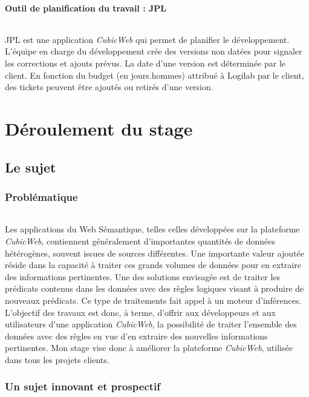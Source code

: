 \documentclass {report}
\begin{document}
\subsection{Outil de planification du travail : JPL}
\paragraph{}
JPL est une application \textit{CubicWeb} qui permet de planifier le développement. L'équipe en charge du développement crée des versions non datées pour signaler les corrections et ajouts prévus. La date d'une version est déterminée par le client. En fonction du budget (en jours.hommes) attribué à Logilab par le client, des tickets peuvent être ajoutés ou retirés d'une version.





\part{Déroulement du stage}
\chapter{Le sujet}
\section{Problématique}
\paragraph{}
Les applications du Web Sémantique, telles celles développées sur la plateforme \textit{CubicWeb}, contiennent généralement d'importantes quantités de données hétérogènes, souvent issues de sources différentes. Une importante valeur ajoutée réside dans la capacité à traiter ces grands volumes de données pour en extraire des informations pertinentes. Une des solutions envisagée est de traiter les prédicats contenus dans les données avec des règles logiques visant à produire de nouveaux prédicats. Ce type de traitements fait appel à un moteur d'inférences. L'objectif des travaux est donc, à terme, d'offrir aux développeurs et aux utilisateurs d'une application \textit{CubicWeb}, la possibilité de traiter l'ensemble des données avec des règles en vue d'en extraire des nouvelles informations pertinentes. Mon stage vise donc à améliorer la plateforme \textit{CubicWeb}, utilisée dans tous les projets clients.


\section{Un sujet innovant et prospectif}
\end{document}
